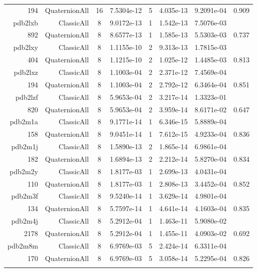 \begin{xltabular}{\textwidth}{r|rcS[table-format=1.4e+2]cS[table-format=1.3e+2]S[table-format=1.4e+2]S[table-format=-1.3]}
194 & QuaternionAll & 16 & 7.5304e-12 & 5 & 4.035e-13 & 9.2091e-04 & 0.909\\  \addlinespace
pdb2lxb & ClassicAll & 8 & 9.0172e-13 & 1 & 1.542e-13 & 7.5076e-03 & \\
892 & QuaternionAll & 8 & 8.6577e-13 & 1 & 1.585e-13 & 5.5303e-03 & 0.737\\  \addlinespace
pdb2lxy & ClassicAll & 8 & 1.1155e-10 & 2 & 9.313e-13 & 1.7815e-03 & \\
404 & QuaternionAll & 8 & 1.1215e-10 & 2 & 1.025e-12 & 1.4485e-03 & 0.813\\  \addlinespace
pdb2lxz & ClassicAll & 8 & 1.1003e-04 & 2 & 2.371e-12 & 7.4569e-04 & \\
194 & QuaternionAll & 8 & 1.1003e-04 & 2 & 2.792e-12 & 6.3464e-04 & 0.851\\  \addlinespace
pdb2lzf & ClassicAll & 8 & 5.9653e-04 & 2 & 3.217e-14 & 1.3323e-01 & \\
820 & QuaternionAll & 8 & 5.9653e-04 & 2 & 3.959e-14 & 8.6171e-02 & 0.647\\  \addlinespace
pdb2m1a & ClassicAll & 8 & 9.1771e-14 & 1 & 6.346e-15 & 5.8889e-04 & \\
158 & QuaternionAll & 8 & 9.0451e-14 & 1 & 7.612e-15 & 4.9233e-04 & 0.836\\  \addlinespace
pdb2m1j & ClassicAll & 8 & 1.5890e-13 & 2 & 1.865e-14 & 6.9861e-04 & \\
182 & QuaternionAll & 8 & 1.6894e-13 & 2 & 2.212e-14 & 5.8270e-04 & 0.834\\  \addlinespace
pdb2m2y & ClassicAll & 8 & 1.8177e-03 & 1 & 2.699e-13 & 4.0431e-04 & \\
110 & QuaternionAll & 8 & 1.8177e-03 & 1 & 2.808e-13 & 3.4452e-04 & 0.852\\  \addlinespace
pdb2m3f & ClassicAll & 8 & 9.5240e-14 & 1 & 3.629e-14 & 4.9801e-04 & \\
134 & QuaternionAll & 8 & 5.7597e-14 & 1 & 4.641e-14 & 4.1603e-04 & 0.835\\  \addlinespace
pdb2m4j & ClassicAll & 8 & 5.2912e-04 & 1 & 1.463e-11 & 5.9080e-02 & \\
2178 & QuaternionAll & 8 & 5.2912e-04 & 1 & 1.455e-11 & 4.0903e-02 & 0.692\\  \addlinespace
pdb2m8m & ClassicAll & 8 & 6.9769e-03 & 5 & 2.424e-14 & 6.3311e-04 & \\
170 & QuaternionAll & 8 & 6.9769e-03 & 5 & 3.058e-14 & 5.2295e-04 & 0.826\\  \addlinespace

\end{xltabular}
